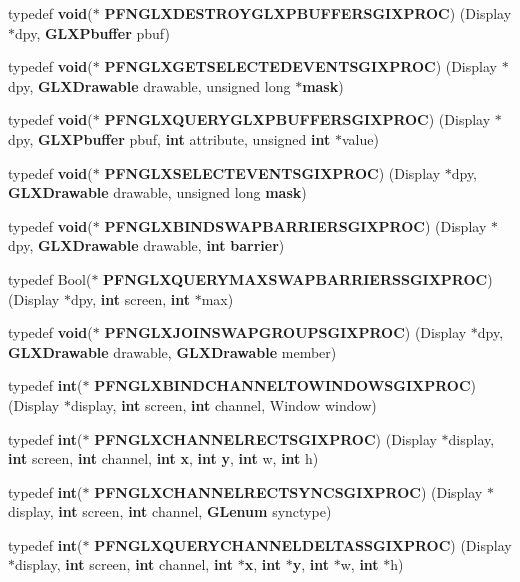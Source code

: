 \begin{DoxyCompactItemize}
\item 
typedef {\bf void}($\ast$ {\bf P\+F\+N\+G\+L\+X\+D\+E\+S\+T\+R\+O\+Y\+G\+L\+X\+P\+B\+U\+F\+F\+E\+R\+S\+G\+I\+X\+P\+R\+OC}) (Display $\ast$dpy, {\bf G\+L\+X\+Pbuffer} pbuf)
\item 
typedef {\bf void}($\ast$ {\bf P\+F\+N\+G\+L\+X\+G\+E\+T\+S\+E\+L\+E\+C\+T\+E\+D\+E\+V\+E\+N\+T\+S\+G\+I\+X\+P\+R\+OC}) (Display $\ast$dpy, {\bf G\+L\+X\+Drawable} drawable, unsigned long $\ast${\bf mask})
\item 
typedef {\bf void}($\ast$ {\bf P\+F\+N\+G\+L\+X\+Q\+U\+E\+R\+Y\+G\+L\+X\+P\+B\+U\+F\+F\+E\+R\+S\+G\+I\+X\+P\+R\+OC}) (Display $\ast$dpy, {\bf G\+L\+X\+Pbuffer} pbuf, {\bf int} attribute, unsigned {\bf int} $\ast$value)
\item 
typedef {\bf void}($\ast$ {\bf P\+F\+N\+G\+L\+X\+S\+E\+L\+E\+C\+T\+E\+V\+E\+N\+T\+S\+G\+I\+X\+P\+R\+OC}) (Display $\ast$dpy, {\bf G\+L\+X\+Drawable} drawable, unsigned long {\bf mask})
\item 
typedef {\bf void}($\ast$ {\bf P\+F\+N\+G\+L\+X\+B\+I\+N\+D\+S\+W\+A\+P\+B\+A\+R\+R\+I\+E\+R\+S\+G\+I\+X\+P\+R\+OC}) (Display $\ast$dpy, {\bf G\+L\+X\+Drawable} drawable, {\bf int} {\bf barrier})
\item 
typedef Bool($\ast$ {\bf P\+F\+N\+G\+L\+X\+Q\+U\+E\+R\+Y\+M\+A\+X\+S\+W\+A\+P\+B\+A\+R\+R\+I\+E\+R\+S\+S\+G\+I\+X\+P\+R\+OC}) (Display $\ast$dpy, {\bf int} screen, {\bf int} $\ast$max)
\item 
typedef {\bf void}($\ast$ {\bf P\+F\+N\+G\+L\+X\+J\+O\+I\+N\+S\+W\+A\+P\+G\+R\+O\+U\+P\+S\+G\+I\+X\+P\+R\+OC}) (Display $\ast$dpy, {\bf G\+L\+X\+Drawable} drawable, {\bf G\+L\+X\+Drawable} member)
\item 
typedef {\bf int}($\ast$ {\bf P\+F\+N\+G\+L\+X\+B\+I\+N\+D\+C\+H\+A\+N\+N\+E\+L\+T\+O\+W\+I\+N\+D\+O\+W\+S\+G\+I\+X\+P\+R\+OC}) (Display $\ast$display, {\bf int} screen, {\bf int} channel, Window window)
\item 
typedef {\bf int}($\ast$ {\bf P\+F\+N\+G\+L\+X\+C\+H\+A\+N\+N\+E\+L\+R\+E\+C\+T\+S\+G\+I\+X\+P\+R\+OC}) (Display $\ast$display, {\bf int} screen, {\bf int} channel, {\bf int} {\bf x}, {\bf int} {\bf y}, {\bf int} w, {\bf int} h)
\item 
typedef {\bf int}($\ast$ {\bf P\+F\+N\+G\+L\+X\+C\+H\+A\+N\+N\+E\+L\+R\+E\+C\+T\+S\+Y\+N\+C\+S\+G\+I\+X\+P\+R\+OC}) (Display $\ast$display, {\bf int} screen, {\bf int} channel, {\bf G\+Lenum} synctype)
\item 
typedef {\bf int}($\ast$ {\bf P\+F\+N\+G\+L\+X\+Q\+U\+E\+R\+Y\+C\+H\+A\+N\+N\+E\+L\+D\+E\+L\+T\+A\+S\+S\+G\+I\+X\+P\+R\+OC}) (Display $\ast$display, {\bf int} screen, {\bf int} channel, {\bf int} $\ast${\bf x}, {\bf int} $\ast${\bf y}, {\bf int} $\ast$w, {\bf int} $\ast$h)

\end{DoxyCompactItemize}
